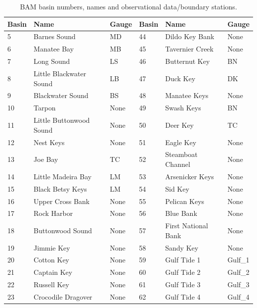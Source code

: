 \begin{table}[H]
\caption{
BAM basin numbers, names and observational data/boundary stations. 
} 
\centering
\begin{tabular}{ l l l | l l l }
\hline
Basin &   Name                   & Gauge & Basin &   Name           & Gauge\\
\hline
5     &  Barnes Sound            & MD    & 44 & Dildo Key Bank      & None\\
6     &  Manatee Bay             & MB    & 45 & Tavernier Creek     & None\\
7     &  Long Sound              & LS    & 46 & Butternut Key       & BN\\
8     &  Little Blackwater Sound & LB    & 47 & Duck Key            & DK\\
9     &  Blackwater Sound        & BS    & 48 & Manatee Keys        & None\\
10    &  Tarpon                  & None  & 49 & Swash Keys          & BN\\
11    &  Little Buttonwood Sound & None  & 50 & Deer Key            & TC\\
12    &  Nest Keys               & None  & 51 & Eagle Key           & None\\
13    &  Joe Bay                 & TC    & 52 & Steamboat Channel   & None\\
14    &  Little Madeira Bay      & LM    & 53 & Arsenicker Keys     & None\\
15    &  Black Betsy Keys        & LM    & 54 & Sid Key             & None\\
16    &  Upper Cross Bank        & None  & 55 & Pelican Keys        & None\\
17    &  Rock Harbor             & None  & 56 & Blue Bank           & None\\
18    &  Buttonwood Sound        & None  & 57 & First National Bank & None\\
19    &  Jimmie Key              & None  & 58 & Sandy Key           & None\\
20    &  Cotton Key              & None  & 59 & Gulf Tide 1         & Gulf\_1\\
21    &  Captain Key             & None  & 60 & Gulf Tide 2         & Gulf\_2\\
22    &  Russell Key             & None  & 61 & Gulf Tide 3         & Gulf\_3\\
23    &  Crocodile Dragover      & None  & 62 & Gulf Tide 4         & Gulf\_4\\

\end{tabular}
\end{table}
